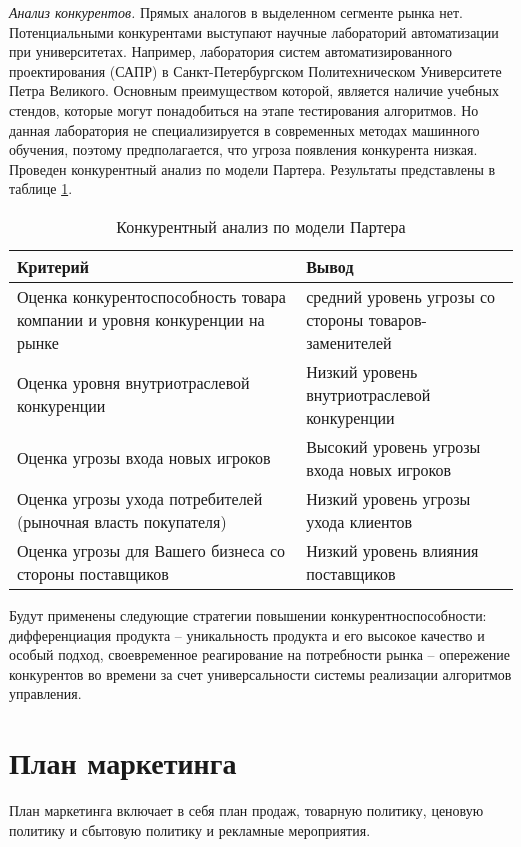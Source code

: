 \textit{Анализ конкурентов.} Прямых аналогов в выделенном сегменте рынка нет. Потенциальными конкурентами выступают научные лабораторий автоматизации при университетах. Например, лаборатория систем автоматизированного проектирования (САПР) в Санкт-Петербургском Политехническом Университете Петра Великого. Основным преимуществом которой, является наличие учебных стендов, которые могут понадобиться на этапе тестирования алгоритмов. Но данная лаборатория не специализируется в современных методах машинного обучения, поэтому предполагается, что угроза появления конкурента низкая. Проведен конкурентный анализ по модели Партера. Результаты представлены в таблице \ref{tab:part}.
\begin{table}[h!]
	\centering
	\caption{Конкурентный анализ по модели Партера}
	\begin{tabular}{|p{8cm}|p{8cm}|}
		\hline
		Критерий & Вывод \\
		\hline
		Оценка конкурентоспособность товара компании и уровня конкуренции на рынке &  средний уровень угрозы со стороны товаров-заменителей \\
		\hline
		Оценка уровня внутриотраслевой конкуренции & Низкий уровень внутриотраслевой конкуренции \\
		\hline 
		Оценка угрозы входа новых игроков & Высокий уровень угрозы входа новых игроков \\
		\hline
		Оценка  угрозы ухода потребителей  (рыночная власть покупателя) & Низкий уровень угрозы ухода клиентов \\
		\hline
		Оценка угрозы для Вашего бизнеса со стороны поставщиков & Низкий уровень влияния поставщиков \\
		\hline
		
	\end{tabular}
	\label{tab:part}
\end{table}

Будут применены следующие стратегии повышении конкурентноспособности:
дифференциация продукта -- уникальность продукта и его высокое качество и особый подход, своевременное реагирование на потребности рынка -- опережение конкурентов во времени за счет универсальности системы реализации алгоритмов управления. 

\section{План маркетинга}
План маркетинга включает в себя план продаж, товарную политику, ценовую политику и сбытовую политику и рекламные мероприятия.

